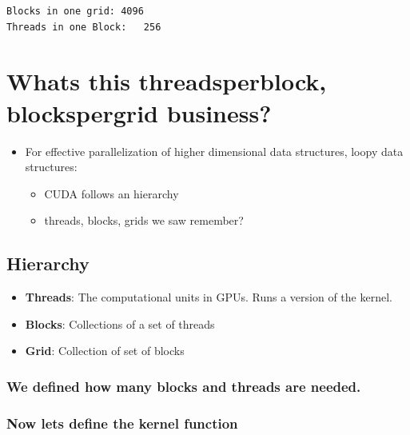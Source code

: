 \documentclass[11pt]{article}
\providecommand{\tightlist}{%
      \setlength{\itemsep}{0pt}\setlength{\parskip}{0pt}}
\begin{document}
    \begin{Verbatim}[commandchars=\\\{\}]
Blocks in one grid:	4096
Threads in one Block:	256

    \end{Verbatim}

    \section{Whats this threadsperblock, blockspergrid
business?}\label{whats-this-threadsperblock-blockspergrid-business}

    \begin{itemize}
\tightlist
\item
  For effective parallelization of higher dimensional data structures,
  loopy data structures:

  \begin{itemize}
  \tightlist
  \item
    CUDA follows an hierarchy
  \item
    threads, blocks, grids we saw remember?
  \end{itemize}
\end{itemize}

    \subsection{Hierarchy}\label{hierarchy}

\begin{itemize}
\tightlist
\item
  \textbf{Threads}: The computational units in GPUs. Runs a version of
  the kernel.
\item
  \textbf{Blocks}: Collections of a set of threads
\item
  \textbf{Grid}: Collection of set of blocks
\end{itemize}

    \subsubsection{We defined how many blocks and threads are
needed.}\label{we-defined-how-many-blocks-and-threads-are-needed.}

\subsubsection{Now lets define the kernel
function}\label{now-lets-define-the-kernel-function}
\end{document}
